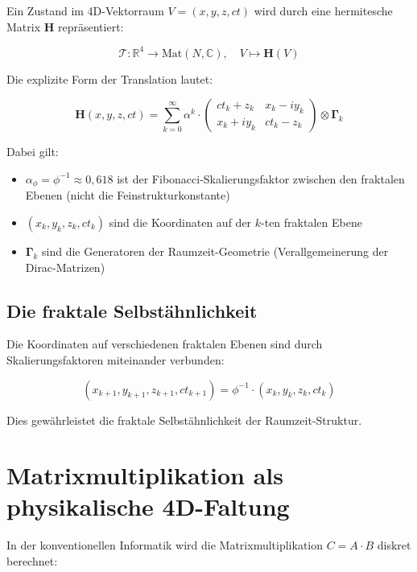 	Ein Zustand im 4D-Vektorraum $V = (x, y, z, ct)$ wird durch eine hermitesche Matrix $\mathbf{H}$ repräsentiert:
	
	\begin{equation}
		\mathcal{T}: \mathbb{R}^4 \rightarrow \text{Mat}(N, \mathbb{C}), \quad V \mapsto \mathbf{H}(V)
	\end{equation}
	
	Die explizite Form der Translation lautet:
	
	\begin{equation}
		\mathbf{H}(x,y,z,ct) = \sum_{k=0}^{\infty} \alpha^k \cdot 
		\begin{pmatrix}
			ct_k + z_k & x_k - iy_k \\
			x_k + iy_k & ct_k - z_k
		\end{pmatrix} \otimes \mathbf{\Gamma}_k
	\end{equation}
	
	Dabei gilt:
	\begin{itemize}
		\item $\alpha_\phi = \phi^{-1} \approx 0{,}618$ ist der Fibonacci-Skalierungsfaktor zwischen den fraktalen Ebenen (nicht die Feinstrukturkonstante)
		\item $(x_k, y_k, z_k, ct_k)$ sind die Koordinaten auf der $k$-ten fraktalen Ebene
		\item $\mathbf{\Gamma}_k$ sind die Generatoren der Raumzeit-Geometrie (Verallgemeinerung der Dirac-Matrizen)
	\end{itemize}
	
	\subsection{Die fraktale Selbstähnlichkeit}
	
	Die Koordinaten auf verschiedenen fraktalen Ebenen sind durch Skalierungsfaktoren miteinander verbunden:
	
	\begin{equation}
		(x_{k+1}, y_{k+1}, z_{k+1}, ct_{k+1}) = \phi^{-1} \cdot (x_k, y_k, z_k, ct_k)
	\end{equation}
	
	Dies gewährleistet die fraktale Selbstähnlichkeit der Raumzeit-Struktur.
	
	\section{Matrixmultiplikation als physikalische 4D-Faltung}
	
	In der konventionellen Informatik wird die Matrixmultiplikation $C = A \cdot B$ diskret berechnet:
	
